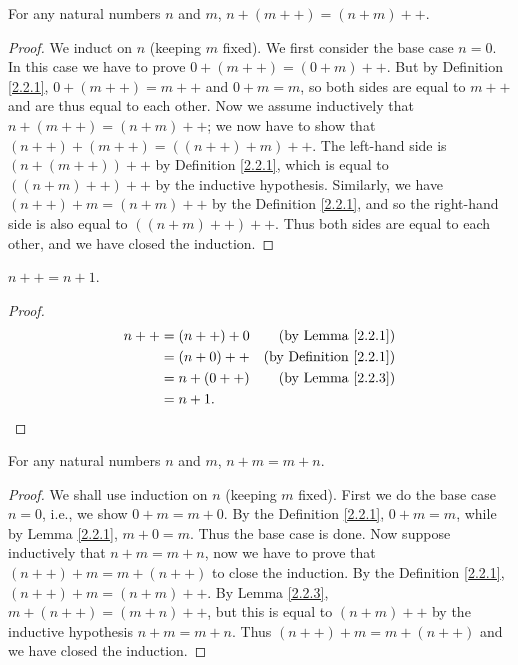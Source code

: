 \begin{lemma}\label{2.2.3}
For any natural numbers \(n\) and \(m\), \(n + (m++) = (n + m)++\).
\end{lemma}

\begin{proof}
We induct on \(n\) (keeping \(m\) fixed).
We first consider the base case \(n = 0\).
In this case we have to prove \(0 + (m++) = (0 + m)++\).
But by Definition \ref{2.2.1}, \(0 + (m++) = m++\) and \(0 + m = m\), so both sides are equal to \(m++\) and are thus equal to each other.
Now we assume inductively that \(n + (m++) = (n + m)++\);
we now have to show that \((n++) + (m++) = ((n++) + m)++\).
The left-hand side is \((n + (m++))++\) by Definition \ref{2.2.1}, which is equal to \(((n+m)++)++\) by the inductive hypothesis.
Similarly, we have \((n++) + m = (n + m)++\) by the Definition \ref{2.2.1}, and so the right-hand side is also equal to \(((n + m)++)++\).
Thus both sides are equal to each other, and we have closed the induction.
\end{proof}

\begin{additional corollary}\label{ac 2.2.2}
\(n++ = n + 1\).
\end{additional corollary}

\begin{proof}
\begin{align*}
n++ &= (n++) + 0 & \text{(by Lemma \ref{2.2.1})} \\
&= (n + 0)++ & \text{(by Definition \ref{2.2.1})} \\
&= n + (0++) & \text{(by Lemma \ref{2.2.3})} \\
&= n + 1.
\end{align*}
\end{proof}

\begin{proposition}\label{2.2.4}
For any natural numbers \(n\) and \(m\), \(n + m = m + n\).
\end{proposition}

\begin{proof}
We shall use induction on \(n\) (keeping \(m\) fixed).
First we do the base case \(n = 0\), i.e., we show \(0 + m = m + 0\).
By the Definition \ref{2.2.1}, \(0 + m = m\), while by Lemma \ref{2.2.1}, \(m + 0 = m\).
Thus the base case is done.
Now suppose inductively that \(n + m = m + n\), now we have to prove that \((n++) + m = m + (n++)\) to close the induction.
By the Definition \ref{2.2.1}, \((n++) + m = (n + m)++\).
By Lemma \ref{2.2.3}, \(m + (n++) = (m + n)++\), but this is equal to \((n + m)++\) by the inductive hypothesis \(n+m=m+n\).
Thus \((n++) + m = m + (n++)\) and we have closed the induction.
\end{proof}


